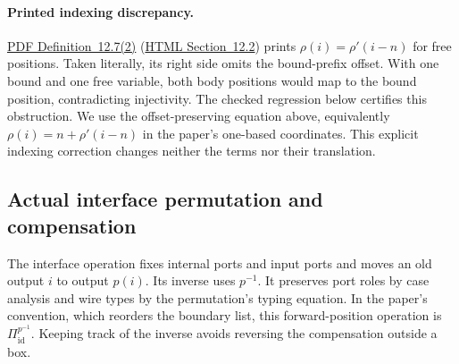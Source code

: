 










\paragraph{Printed indexing discrepancy.}
\href{https://arxiv.org/pdf/1907.01257v5\#page=45}{PDF Definition~12.7(2)}
(\href{https://arxiv.org/html/1907.01257v5\#S12.SS2}{HTML Section~12.2})
prints $\rho(i)=\rho'(i-n)$ for free positions. Taken literally, its right side
omits the bound-prefix offset. With one bound and one free variable, both body
positions would map to the bound position, contradicting injectivity. The checked
regression below certifies this obstruction. We use the offset-preserving equation
above, equivalently $\rho(i)=n+\rho'(i-n)$ in the paper's one-based coordinates.
This explicit indexing correction changes neither the terms nor their translation.


\subsection{Actual interface permutation and compensation}

The interface operation fixes internal ports and input ports and moves an old
output $i$ to output $p(i)$. Its inverse uses $p^{-1}$. It preserves port roles
by case analysis and wire types by the permutation's typing equation. In the
paper's convention, which reorders the boundary list, this forward-position
operation is $\Pi^{p^{-1}}_{\mathrm{id}}$. Keeping track of the inverse avoids
reversing the compensation outside a box.

